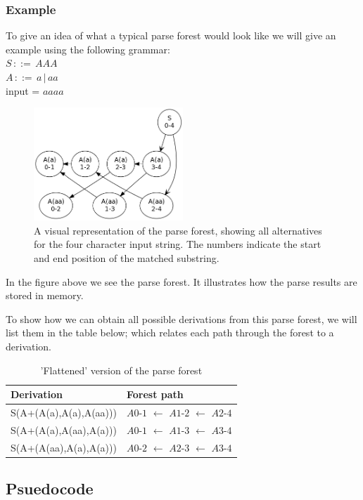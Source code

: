 \documentclass[a4paper,10pt]{article}
\begin{document}
\subsubsection{Example}
To give an idea of what a typical parse forest would look like we will give an example using the following grammar:\\
$S\,::=\,AAA$\\
$A\,::=\,a\,|\,aa$\\
input = $aaaa$

\begin{figure}[H]
\centering
\includegraphics[width=0.5\textwidth]{a_aa-forest.png}
\caption{A visual representation of the parse forest, showing all alternatives for the four character input string. The numbers indicate the start and end position of the matched substring.}
\end{figure}

In the figure above we see the parse forest. It illustrates how the parse results are stored in memory.

To show how we can obtain all possible derivations from this parse forest, we will list them in the table below; which relates each path through the forest to a derivation.

\begin{table}[H]
\centering
\begin{tabular}{ p{15em} p{15em} }
Derivation & Forest path\\
\hline
S(A+(A(a),A(a),A(aa))) & $A0$-$1$ $\leftarrow$ $A1$-$2$ $\leftarrow$ $A2$-$4$\\
S(A+(A(a),A(aa),A(a))) & $A0$-$1$ $\leftarrow$ $A1$-$3$ $\leftarrow$ $A3$-$4$\\
S(A+(A(aa),A(a),A(a))) & $A0$-$2$ $\leftarrow$ $A2$-$3$ $\leftarrow$ $A3$-$4$
\end{tabular}
\caption{'Flattened' version of the parse forest}
\end{table}

\subsection{Psuedocode}
\end{document}
